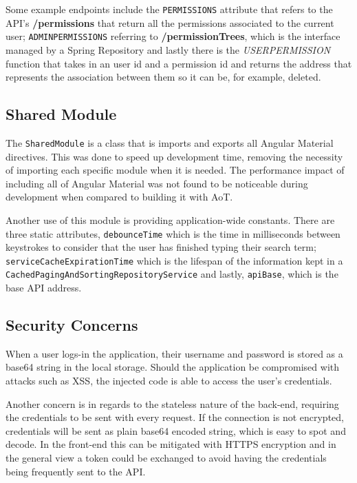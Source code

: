 Some example endpoints include the \texttt{PERMISSIONS} attribute that refers to the \gls{API}'s \textbf{/permissions} that return all the permissions associated to the current user; \texttt{ADMIN\textunderscore PERMISSIONS} referring to \textbf{/permissionTrees}, which is the interface managed by a Spring Repository and lastly there is the \textit{USER\textunderscore PERMISSION} function that takes in an user id and a permission id and returns the address that represents the association between them so it can be, for example, deleted.

\subsection{Shared Module}
The \texttt{SharedModule} is a class that is imports and exports all Angular Material directives. This was done to speed up development time, removing the necessity of importing each specific module when it is needed. The performance impact of including all of Angular Material was not found to be noticeable during development when compared to building it with \gls{AoT}.

Another use of this module is providing application-wide constants. There are three static attributes, \texttt{debounceTime} which is the time in milliseconds between keystrokes to consider that the user has finished typing their search term; \texttt{serviceCacheExpirationTime} which is the lifespan of the information kept in a \texttt{CachedPagingAndSortingRepositoryService} and lastly, \texttt{apiBase}, which is the base \gls{API} address.

\subsection{Security Concerns}

When a user logs-in the application, their username and password is stored as a base64 string in the local storage. Should the application be compromised with attacks such as \gls{XSS}, the injected code is able to access the user's credentials.

Another concern is in regards to the stateless nature of the back-end, requiring the credentials to be sent with every request. If the connection is not encrypted, credentials will be sent as plain base64 encoded string, which is easy to spot and decode. In the front-end this can be mitigated with \gls{HTTPS} encryption and in the general view a token could be exchanged to avoid having the credentials being frequently sent to the \gls{API}.

